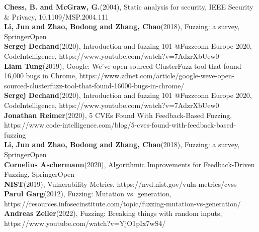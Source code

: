 \documentclass[journal=tosc,final]{iacrtrans}
\begin{document}
\noindent[3] \textbf{Chess, B. and McGraw, G.}(2004), Static analysis for security, IEEE Security \& Privacy, 10.1109/MSP.2004.111
\\


\noindent[4] \textbf{Li, Jun and Zhao, Bodong and Zhang, Chao}(2018),     Fuzzing: a survey, SpringerOpen
\\

\noindent [5] \textbf{Sergej Dechand}(2020), Introduction and fuzzing 101 @Fuzzconn Europe 2020, CodeIntelligence, https://www.youtube.com/watch?v=7AdzrXbUew0
\\

\noindent [6] \textbf{Liam Tung}(2019),  Google: We've open-sourced ClusterFuzz tool that found 16,000 bugs in Chrome, https://www.zdnet.com/article/google-weve-open-sourced-clusterfuzz-tool-that-found-16000-bugs-in-chrome/
\\

\noindent [7] \textbf{Sergej Dechand}(2020), Introduction and fuzzing 101 @Fuzzconn Europe 2020, CodeIntelligence, https://www.youtube.com/watch?v=7AdzrXbUew0
\\

\noindent[8] \textbf{Jonathan Reimer}(2020), 5 CVEs Found With Feedback-Based Fuzzing, https://www.code-intelligence.com/blog/5-cves-found-with-feedback-based-fuzzing
\\

\noindent[9] \textbf{Li, Jun and Zhao, Bodong and Zhang, Chao}(2018),     Fuzzing: a survey, SpringerOpen
\\


\noindent[10] \textbf{Cornelius Aschermann}(2020), Algorithmic Improvements for
Feedback-Driven Fuzzing, SpringerOpen
\\

\noindent[11] \textbf{NIST}(2019), Vulnerability Metrics, https://nvd.nist.gov/vuln-metrics/cvss
\\

\noindent[12] \textbf{Parul Garg}(2012), Fuzzing: Mutation vs. generation, https://resources.infosecinstitute.com/topic/fuzzing-mutation-vs-generation/
\\

\noindent[13] \textbf{Andreas Zeller}(2022), Fuzzing: Breaking things with random inputs, https://www.youtube.com/watch?v=YjO1pIx7wS4/
\\
\end{document}
